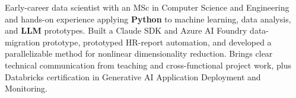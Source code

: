 

\begin{cvparagraph}

Early-career data scientist with an MSc in Computer Science and Engineering and hands-on experience applying \textbf{Python} to machine learning, data analysis, and \textbf{LLM} prototypes. Built a Claude SDK and Azure AI Foundry data-migration prototype, prototyped HR-report automation, and developed a parallelizable method for nonlinear dimensionality reduction. Brings clear technical communication from teaching and cross-functional project work, plus Databricks certification in Generative AI Application Deployment and Monitoring.
\end{cvparagraph}
